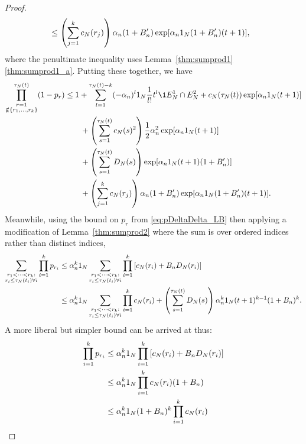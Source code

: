 \begin{proof}
\begin{align*}
&\leq \left( \sum_{j=1}^k c_N(r_j) \right)
        \alpha_n (1 + B_n^\prime) 
        \exp[ \alpha_n 1_N (1 + B_n^\prime) (t+1) ] ,
\end{align*}
where the penultimate inequality uses Lemma~\ref{thm:sumprod1}\ref{thm:sumprod1_a}.
Putting these together, we have
\begin{align}
\prod_{\substack{r=1 \\ \notin \{r_1,\dots,r_k\} }}^{\tau_N(t)} (1-p_r)
&\leq 1+ \sum_{l=1}^{\tau_N(t) -k} (-\alpha_n)^l \ON \frac{1}{l!} t^l
        \1{E_N^1 \cap E_N^2}
        + c_N(\tau_N(t)) \exp[ \alpha_n \ON (t+1) ] \notag\\
    &\qquad+ \left( \sum_{s=1}^{\tau_N(t)} c_N(s)^2 \right)
        \frac{1}{2} \alpha_n^2 \exp[ \alpha_n \ON (t+1) ] \notag\\
    &\qquad+ \left( \sum_{s=1}^{\tau_N(t)} D_N(s) \right)
        \exp[ \alpha_n \ON (t+1) (1+B_n^\prime) ] \notag\\
    &\qquad+ \left( \sum_{j=1}^k c_N(r_j) \right)
        \alpha_n (1 + B_n^\prime)
        \exp[ \alpha_n \ON (1 + B_n^\prime) (t+1) ] . \label{eq:034b}
\end{align}
Meanwhile, using the bound on $p_r$ from \eqref{eq:pDeltaDelta_LB} then applying a modification of Lemma~\ref{thm:sumprod2} where the sum is over ordered indices rather than distinct indices,
\begin{align}
\sum_{\substack{r_1 <\dots< r_k :\\ r_i \leq \tau_N(t_i) \forall i}}
        \prod_{i=1}^k p_{r_i}
&\leq \alpha_n^k 1_N 
        \sum_{\substack{r_1 <\dots< r_k :\\ r_i \leq \tau_N(t_i) \forall i}}
        \prod_{i=1}^k \left[ c_N(r_i) + B_n D_N(r_i) \right] \notag\\
&\leq \alpha_n^k 1_N
        \sum_{\substack{r_1 <\dots< r_k :\\ r_i \leq \tau_N(t_i) \forall i}}
        \prod_{i=1}^k c_N(r_i)
        + \left( \sum_{s=1}^{\tau_N(t)} D_N(s) \right)
        \alpha_n^k 1_N (t+1)^{k-1} (1+B_n)^k . \label{eq:035}
\end{align}
A more liberal but simpler bound can be arrived at thus:
\begin{align}
\prod_{i=1}^k p_{r_i}
&\leq \alpha_n^k \ON 
        \prod_{i=1}^k \left[ c_N(r_i) + B_n D_N(r_i) \right] \notag\\
&\leq \alpha_n^k \ON 
        \prod_{i=1}^k c_N(r_i) (1 + B_n) \notag\\
&\leq \alpha_n^k \ON (1 + B_n)^k
        \prod_{i=1}^k c_N(r_i) \label{eq:036}

\end{align}
\end{proof}
